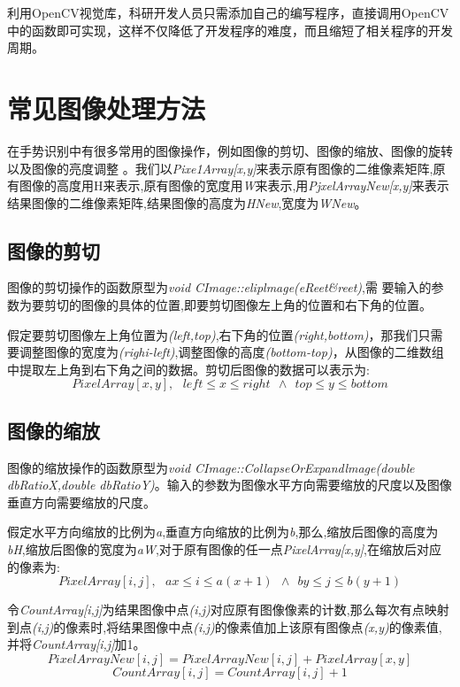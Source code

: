 \documentclass{XDBAthesis}
\begin{document}
利用OpenCV视觉库，科研开发人员只需添加自己的编写程序，直接调用OpenCV中的函数即可实现，这样不仅降低了开发程序的难度，而且缩短了相关程序的开发周期。

\section{常见图像处理方法}
    在手势识别中有很多常用的图像操作，例如图像的剪切、图像的缩放、图像的旋转以及图像的亮度调整\cite{何阳清2004基于几何特征的手势识别算法研究} 。我们以\emph{Pixe1Array[x,y]}来表示原有图像的二维像素矩阵,原有图像的高度用H来表示,原有图像的宽度用\emph{W}来表示,用\emph{PjxelArrayNew[x,y]}来表示结果图像的二维像素矩阵,结果图像的高度为\emph{HNew},宽度为\emph{WNew}。

\subsection{图像的剪切}

    图像的剪切操作的函数原型为\emph{void CImage::eliplmage(eReet\&reet)},需
要输入的参数为要剪切的图像的具体的位置,即要剪切图像左上角的位置和右下角的位置。

假定要剪切图像左上角位置为\emph{(left,top)},右下角的位置\emph{(right,bottom)}，那我们只需要调整图像的宽度为\emph{(righi-left)},调整图像的高度\emph{(bottom-top)}，从图像的二维数组中提取左上角到右下角之间的数据。剪切后图像的数据可以表示为:
$$
    PixelArray[x,y] ,\ \ \ left\leq x \leq right \ \ \wedge\ \  top \leq y \leq bottom
$$
\subsection{图像的缩放}

    图像的缩放操作的函数原型为\emph{void CImage::CollapseOrExpandlmage(double dbRatioX,double dbRatioY)}\cite{殷涛2004基于几何矩的手势识别算法}。输入的参数为图像水平方向需要缩放的尺度以及图像垂直方向需要缩放的尺度。

假定水平方向缩放的比例为\emph{a},垂直方向缩放的比例为\emph{b},那么,缩放后图像的高度为\emph{bH},缩放后图像的宽度为\emph{aW},对于原有图像的任一点\emph{PixelArray[x,y]},在缩放后对应的像素为:
$$
    PixelArray[i,j] ,\ \ \ ax\leq i \leq a(x+1) \ \ \wedge\ \  by \leq j \leq b(y+1)
$$


    令\emph{CountArray[i,j]}为结果图像中点\emph{(i,j)}对应原有图像像素的计数,那么每次有点映射到点\emph{(i,j)}的像素时,将结果图像中点\emph{(i,j)}的像素值加上该原有图像点\emph{(x,y)}的像素值,并将\emph{CountArray[i,j]}加1。
$$
    PixelArrayNew[i,j]=PixelArrayNew[i,j]+PixelArray[x,y]
$$
$$
    CountArray[i,j]=CountArray[i,j]+1
$$
\end{document}
